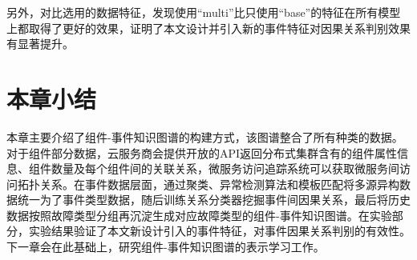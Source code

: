 另外，对比选用的数据特征，发现使用“multi”比只使用“base”的特征在所有模型上都取得了更好的效果，证明了本文设计并引入新的事件特征对因果关系判别效果有显著提升。

\section{本章小结}
本章主要介绍了组件-事件知识图谱的构建方式，该图谱整合了所有种类的数据。对于组件部分数据，云服务商会提供开放的API返回分布式集群含有的组件属性信息、组件数量及每个组件间的关联关系，微服务访问追踪系统可以获取微服务间访问拓扑关系。在事件数据层面，通过聚类、异常检测算法和模板匹配将多源异构数据统一为了事件类型数据，随后训练关系分类器挖掘事件间因果关系，最后将历史数据按照故障类型分组再沉淀生成对应故障类型的组件-事件知识图谱。在实验部分，实验结果验证了本文新设计引入的事件特征，对事件因果关系判别的有效性。下一章会在此基础上，研究组件-事件知识图谱的表示学习工作。


